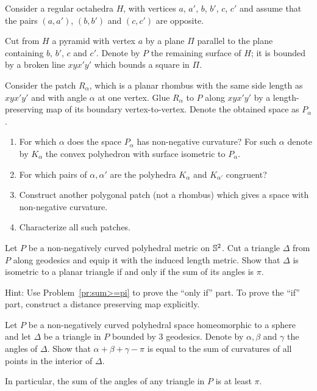 \begin{pr}
Consider a regular octahedra $H$,
with vertices $a$, $a'$, $b$, $b'$, $c$, $c'$
and assume that the pairs $(a,a')$, $(b,b')$ and $(c,c')$
are opposite. 

Cut from $H$ a pyramid with vertex $a$ by a plane $\Pi$ parallel to the plane containing $b$, $b'$, $c$ and $c'$.
Denote by $P$ the remaining surface of $H$;
it is bounded by a broken line $xyx'y'$ which bounds a square in $\Pi$.

Consider the patch $R_\alpha$, which is a planar rhombus with the same side length as $xyx'y'$ and with angle $\alpha$ at one vertex.
Glue $R_\alpha$ to $P$ along $xyx'y'$ by a length-preserving map of its boundary vertex-to-vertex.
Denote the obtained space as $P_\alpha$.

\begin{enumerate}
\item For which $\alpha$ does the space $P_\alpha$ has non-negative curvature?
For such $\alpha$ denote by $K_\alpha$ the convex polyhedron with surface isometric to $P_\alpha$.

\item For which pairs of $\alpha, \alpha'$ are the polyhedra $K_\alpha$ and $K_{\alpha'}$ congruent?

\item Construct another polygonal patch (not a rhombus) which gives a space with non-negative curvature.

\item   Characterize all such patches.
\end{enumerate}
\end{pr}

\begin{pr}
Let $P$ be a non-negatively curved polyhedral metric on $\mathbb{S}^2$. 
Cut a triangle $\Delta$ from $P$ along geodesics and equip it with the induced length metric.
Show that $\Delta$ is isometric to a planar triangle if and only if the sum of its angles is $\pi$.
\end{pr}

Hint: Use Problem~\ref{pr:sum>=pi} to prove the ``only if'' part. To prove the ``if'' part, construct a distance preserving map explicitly.





\begin{pr}\label{pr:sum>=pi}
Let $P$ be a non-negatively curved polyhedral space homeomorphic to a sphere
and let $\Delta$ be a triangle in $P$ bounded by 3 geodesics.
Denote by $\alpha, \beta$ and $\gamma$ the angles of $\Delta$.
Show that $\alpha+\beta+\gamma-\pi$  is equal to the sum of curvatures of all points in the interior of $\Delta$. 

In particular, the sum of the angles of any triangle in $P$ is at least $\pi$.
\end{pr}

